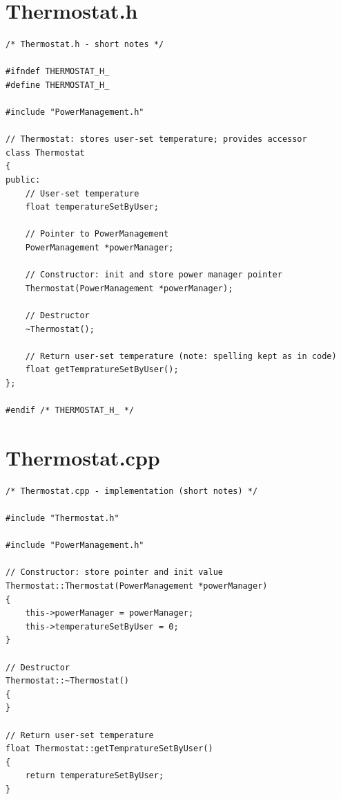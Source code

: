 \documentclass[11pt]{article}
\begin{document}
\section*{Thermostat.h}
\begin{lstlisting}
/* Thermostat.h - short notes */

#ifndef THERMOSTAT_H_
#define THERMOSTAT_H_

#include "PowerManagement.h"

// Thermostat: stores user-set temperature; provides accessor
class Thermostat
{
public:
    // User-set temperature
    float temperatureSetByUser;

    // Pointer to PowerManagement
    PowerManagement *powerManager;

    // Constructor: init and store power manager pointer
    Thermostat(PowerManagement *powerManager);

    // Destructor
    ~Thermostat();

    // Return user-set temperature (note: spelling kept as in code)
    float getTempratureSetByUser();
};

#endif /* THERMOSTAT_H_ */
\end{lstlisting}

\section*{Thermostat.cpp}
\begin{lstlisting}
/* Thermostat.cpp - implementation (short notes) */

#include "Thermostat.h"

#include "PowerManagement.h"

// Constructor: store pointer and init value
Thermostat::Thermostat(PowerManagement *powerManager)
{
    this->powerManager = powerManager;
    this->temperatureSetByUser = 0;
}

// Destructor
Thermostat::~Thermostat()
{
}

// Return user-set temperature
float Thermostat::getTempratureSetByUser()
{
    return temperatureSetByUser;
}
\end{lstlisting}
\end{document}
